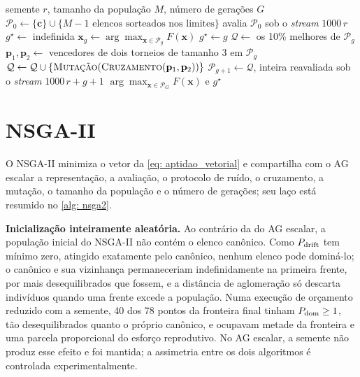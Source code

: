 \begin{algoritmo}[htb]
    \caption{Algoritmo genético escalar.}
    \label{alg: ag}
    \begin{algorithmic}[1]
        \Require semente $r$, tamanho da população $M$, número de gerações $G$
        \State $\mathcal{P}_0 \gets \{\mathbf{c}\} \cup \{M - 1 \text{ elencos sorteados nos limites}\}$
        \State avalia $\mathcal{P}_0$ sob o \textit{stream} $1000\,r$ 
        \State $g^\star \gets$ indefinida
            \State $\mathbf{x}_g \gets \arg\max_{\mathbf{x} \in \mathcal{P}_g} F(\mathbf{x})$
             
                    \State $g^\star \gets g$
                \EndIf
            \EndIf
            \State $\mathcal{Q} \gets$ os 10\% melhores de $\mathcal{P}_g$ 
                \State $\mathbf{p}_1, \mathbf{p}_2 \gets$ vencedores de dois torneios de tamanho 3 em $\mathcal{P}_g$
                \State $\mathcal{Q} \gets \mathcal{Q} \cup \{\textsc{Mutação}(\textsc{Cruzamento}(\mathbf{p}_1, \mathbf{p}_2))\}$
            \EndWhile
            \State $\mathcal{P}_{g+1} \gets \mathcal{Q}$, inteira reavaliada sob o \textit{stream} $1000\,r + g + 1$
        \EndFor
        \State \Return $\arg\max_{\mathbf{x} \in \mathcal{P}_G} F(\mathbf{x})$ e $g^\star$
    \end{algorithmic}
    \source
\end{algoritmo}

\section{NSGA-II}
\label{sec: nsga2_metodo}

O NSGA-II \cite{deb2002nsga} minimiza o vetor da \autoref{eq: aptidao_vetorial} e compartilha com o AG escalar a representação, a avaliação, o protocolo de ruído, o cruzamento, a mutação, o tamanho da população e o número de gerações; seu laço está resumido no \autoref{alg: nsga2}.

\textbf{Inicialização inteiramente aleatória.} Ao contrário da do AG escalar, a população inicial do NSGA-II não contém o elenco canônico. Como $P_{\mathrm{drift}}$ tem mínimo zero, atingido exatamente pelo canônico, nenhum elenco pode dominá-lo; o canônico e sua vizinhança permaneceriam indefinidamente na primeira frente, por mais desequilibrados que fossem, e a distância de aglomeração só descarta indivíduos quando uma frente excede a população. Numa execução de orçamento reduzido com a semente, 40 dos 78 pontos da fronteira final tinham $P_{\mathrm{dom}} \ge 1$, tão desequilibrados quanto o próprio canônico, e ocupavam metade da fronteira e uma parcela proporcional do esforço reprodutivo. No AG escalar, a semente não produz esse efeito e foi mantida; a assimetria entre os dois algoritmos é controlada experimentalmente.

